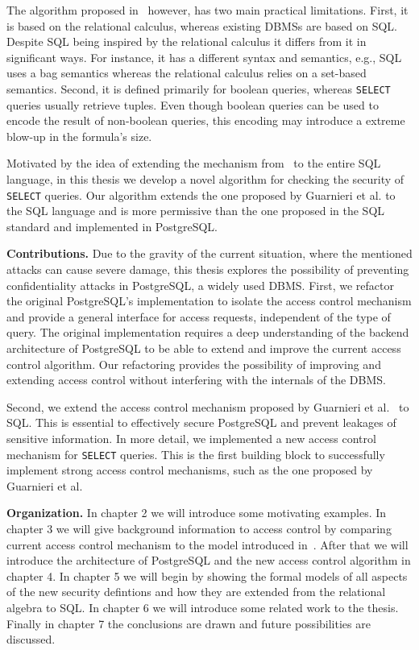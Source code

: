 The algorithm proposed in~\cite{guarnieri2016strong} however, has two main practical limitations.
%
First, it is based on the relational calculus, whereas existing DBMSs are based on SQL. Despite SQL being inspired by the relational calculus it differs from it in significant ways. For instance, it has a different syntax and semantics, e.g., SQL uses a bag semantics whereas the relational calculus relies on a set-based semantics.
%
Second, it is defined primarily for boolean queries, whereas \texttt{SELECT} queries usually retrieve tuples.
%
Even though boolean queries can be used to encode the result of non-boolean queries, this encoding may introduce a extreme blow-up in the formula's size.

Motivated by the idea of extending the mechanism from~\cite{guarnieri2016strong} to the entire SQL language, in this thesis we develop a novel algorithm for checking the security of \texttt{SELECT} queries.
%
Our algorithm extends the one proposed by Guarnieri et al. to the SQL language and is more permissive than the one proposed in the SQL standard and  implemented in PostgreSQL.

\smallskip
\noindent
{\bf Contributions.}
%
%
Due to the gravity of the current situation, where the mentioned attacks can cause severe damage, this thesis explores the possibility of preventing confidentiality attacks in PostgreSQL, a widely used DBMS. 
%
First, we refactor the original PostgreSQL's implementation to isolate the access control mechanism and provide a general interface for access requests, independent of the type of query.
%
The original implementation requires a deep understanding of the backend architecture of PostgreSQL to be able to extend and improve the current access control algorithm.
%
Our refactoring provides the possibility of improving and extending access control without interfering with the internals of the DBMS.
%

Second, we extend the access control mechanism proposed by Guarnieri et al.~\cite{guarnieri2016strong} to SQL.
%
This is essential to effectively secure PostgreSQL and prevent leakages of sensitive information.
%
In more detail, we implemented a new access control mechanism for \texttt{SELECT} queries.
%
This is the first building block to successfully implement strong access control mechanisms, such as the one proposed by Guarnieri et al.

\smallskip
\noindent
{\bf Organization.}
%
In chapter 2 we will introduce some motivating examples.
%
In chapter 3 we will give background information to access control by comparing current access control mechanism to the model introduced in~\cite{guarnieri2016strong}.
%
After that we will introduce the architecture of PostgreSQL and the new access control algorithm in chapter 4. 
%
In chapter 5 we will begin by showing the formal models of all aspects of the new security defintions and how they are extended from the relational algebra to SQL.  
%
In chapter 6 we will introduce some related work to the thesis. 
%
Finally in chapter 7 the conclusions are drawn and future possibilities are discussed.
